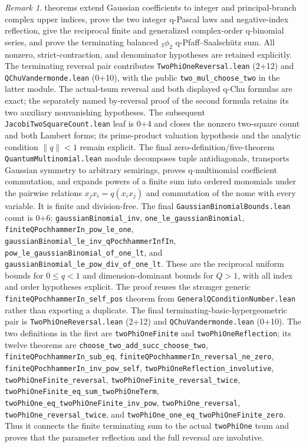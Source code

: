 \documentclass[11pt,oneside]{article}
\theoremstyle{definition}
\theoremstyle{remark}
\newtheorem{remark}[theorem]{Remark}
\begin{document}
\begin{remark}
theorems extend Gaussian coefficients to integer and principal-branch complex
upper indices, prove the two integer q-Pascal laws and negative-index
reflection, give the reciprocal finite and generalized complex-order
q-binomial series, and prove the terminating balanced \({}_3\phi_2\)
q-Pfaff--Saalsch\"utz sum.  All nonzero, strict-contraction, and denominator
hypotheses are retained explicitly.
The terminating reversal pair contributes
\nolinkurl{TwoPhiOneReversal.lean} (2+12) and
\nolinkurl{QChuVandermonde.lean} (0+10), with the public
\nolinkurl{two_mul_choose_two} in the latter module.  The actual-tsum reversal
and both displayed q-Chu formulas are exact; the separately named by-reversal
proof of the second formula retains its two auxiliary nonvanishing hypotheses.
The subsequent \nolinkurl{JacobiTwoSquareCount.lean}
leaf is 0+4 and closes the nonzero two-square count and both Lambert forms;
its prime-product valuation hypothesis and the analytic condition
\(\lVert q\rVert<1\) remain explicit.
The final zero-definition/five-theorem
\nolinkurl{QuantumMultinomial.lean} module decomposes tuple antidiagonals,
transports Gaussian symmetry to arbitrary semirings, proves q-multinomial
coefficient commutation, and expands powers of a finite sum into ordered
monomials under the pairwise relations \(x_jx_i=q(x_ix_j)\) and commutation of
the nome with every variable.  It is finite and division-free.
The final \nolinkurl{GaussianBinomialBounds.lean} count is 0+6:
\nolinkurl{gaussianBinomial_inv}, \nolinkurl{one_le_gaussianBinomial},
\nolinkurl{finiteQPochhammerIn_pow_le_one},
\nolinkurl{gaussianBinomial_le_inv_qPochhammerInfIn},
\nolinkurl{pow_le_gaussianBinomial_of_one_lt}, and
\nolinkurl{gaussianBinomial_le_pow_div_of_one_lt}.  These are the reciprocal
uniform bounds for \(0\le q<1\) and dimension-dominant bounds for \(Q>1\),
with all index and order hypotheses explicit.  The proof reuses the stronger
generic \nolinkurl{finiteQPochhammerIn_self_pos} theorem from
\nolinkurl{GeneralQConditionNumber.lean} rather than exporting a duplicate.
The final terminating-basic-hypergeometric pair is
\nolinkurl{TwoPhiOneReversal.lean} (2+12) and
\nolinkurl{QChuVandermonde.lean} (0+10).  The two definitions in the first are
\nolinkurl{twoPhiOneFinite} and \nolinkurl{twoPhiOneReflection}; its twelve
theorems are \nolinkurl{choose_two_add_succ_choose_two},
\nolinkurl{finiteQPochhammerIn_sub_eq},
\nolinkurl{finiteQPochhammerIn_reversal_ne_zero},
\nolinkurl{finiteQPochhammerIn_inv_pow_self},
\nolinkurl{twoPhiOneReflection_involutive},
\nolinkurl{twoPhiOneFinite_reversal},
\nolinkurl{twoPhiOneFinite_reversal_twice},
\nolinkurl{twoPhiOneFinite_eq_sum_twoPhiOneTerm},
\nolinkurl{twoPhiOne_eq_twoPhiOneFinite_inv_pow},
\nolinkurl{twoPhiOne_reversal}, \nolinkurl{twoPhiOne_reversal_twice}, and
\nolinkurl{twoPhiOne_one_eq_twoPhiOneFinite_zero}.  Thus it connects the
finite terminating sum to the actual \nolinkurl{twoPhiOne} tsum and proves
that the parameter reflection and the full reversal are involutive.


\end{remark}
\end{document}
